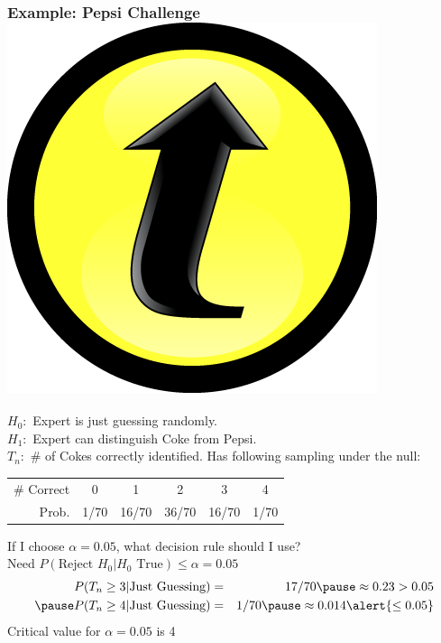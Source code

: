 \documentclass[handout]{beamer}
\begin{document}
\begin{frame}
\frametitle{Example: Pepsi Challenge \hfill \includegraphics[scale = 0.05]{./images/clicker}}
\footnotesize 
$H_0\colon$ Expert is just guessing randomly.\\
$H_1\colon$ Expert can distinguish Coke from Pepsi.\\
$T_n\colon$ \# of Cokes correctly identified. Has following sampling under the null:
		\begin{center}
		\begin{tabular}{rccccc}
		\hline \footnotesize
		\# Correct & 0 & 1 & 2 & 3 & 4\\
		Prob.&1/70 & 16/70 & 36/70 & 16/70 &1/70\\
		\hline
		\end{tabular}
	\end{center}
	\vspace{2em}
	\normalsize
	\alert{If I choose $\alpha =0.05$, what decision rule should I use?}\\
\vspace{1em}
	Need $P(\mbox{Reject } H_0|H_0 \mbox{ True})\leq \alpha = 0.05$ \pause
	\begin{eqnarray*}
		P(T_n \geq 3 |\mbox{Just Guessing}) &=& 17/70 \pause \approx 0.23 > 0.05 \\\pause
	P(T_n \geq 4 |\mbox{Just Guessing}) &=& 1/70 \pause \approx 0.014 \alert{\leq 0.05}
	\end{eqnarray*}
	\vspace{1em}\pause
	\alert{Critical value for $\alpha = 0.05$ is 4}
\end{frame}
\end{document}
